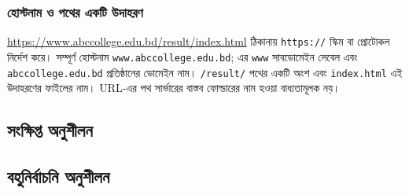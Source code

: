 
\subsubsection{হোস্টনাম ও পথের একটি উদাহরণ}
\url{https://www.abccollege.edu.bd/result/index.html} ঠিকানায় \texttt{https://} স্কিম বা প্রোটোকল নির্দেশ করে। সম্পূর্ণ হোস্টনাম \texttt{www.abccollege.edu.bd}; এর \texttt{www} সাবডোমেইন লেবেল এবং \texttt{abccollege.edu.bd} প্রতিষ্ঠানের ডোমেইন নাম। \texttt{/result/} পথের একটি অংশ এবং \texttt{index.html} এই উদাহরণের ফাইলের নাম। URL-এর পথ সার্ভারের বাস্তব ফোল্ডারের নাম হওয়া বাধ্যতামূলক নয়।

\subsection{সংক্ষিপ্ত অনুশীলন}
\par\noindent
\begin{minipage}[t]{.48\linewidth}\vspace{0pt}
\end{minipage}\hfill
\begin{minipage}[t]{.48\linewidth}\vspace{0pt}
\end{minipage}\par\smallskip
\par\noindent
\begin{minipage}[t]{.48\linewidth}\vspace{0pt}
\end{minipage}\hfill
\begin{minipage}[t]{.48\linewidth}\vspace{0pt}
\end{minipage}\par\smallskip
\par\noindent
\begin{minipage}[t]{.48\linewidth}\vspace{0pt}
\end{minipage}\par\smallskip


\subsection{বহুনির্বাচনি অনুশীলন}

